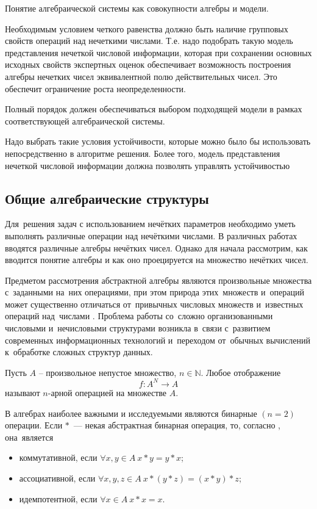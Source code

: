 Понятие алгебраической системы как совокупности алгебры и модели.
 
Необходимым условием четкого равенства должно быть наличие групповых свойств операций над нечеткими числами. Т.е. надо подобрать такую модель представления нечеткой числовой информации, которая при сохранении основных исходных свойств экспертных оценок обеспечивает возможность построения алгебры нечетких чисел эквивалентной  полю действительных чисел. Это обеспечит ограничение роста неопределенности.

Полный порядок должен обеспечиваться выбором подходящей модели в рамках соответствующей алгебраической системы.

Надо выбрать такие условия устойчивости, которые можно было бы использовать непосредственно в алгоритме решения. Более того, модель представления нечеткой числовой информации должна позволять управлять устойчивостью

\subsection{Общие алгебраические структуры}

Для~решения задач с использованием нечётких параметров необходимо уметь выполнять различные операции над нечёткими числами. В различных работах вводятся различные алгебры нечётких чисел. Однако для начала рассмотрим, как вводится понятие алгебры и как оно проецируется на множество нечётких чисел.

Предметом рассмотрения абстрактной алгебры являются произвольные множества с~заданными на~них операциями, при этом природа этих~множеств и~операций может существенно отличаться от~привычных числовых множеств и~известных операций над~числами \cite{Bauman_DM}. Проблема работы со~сложно организованными числовыми и~нечисловыми структурами возникла в~связи с~развитием современных информационных технологий и~переходом от~обычных вычислений к~обработке сложных структур данных.

\begin{mydef}
Пусть $A$ – произвольное непустое множество, $n\in \mathbb{N}$. Любое отображение 
\[
	f:A^N \to A
\] 
называют $n$-арной операцией на множестве $A$.
\end{mydef}

В алгебрах наиболее важными и исследуемыми являются бинарные $\left( n=2 \right)$ операции. Если $*$~--- некая абстрактная бинарная операция, то, согласно \cite{Bauman_DM}, она~является
\begin{itemize}
	\item коммутативной, если $\forall x,y\in A\ x*y=y*x$;
	\item ассоциативной, если $\forall x,y,z\in A\ x*\left( y*z \right)=\left( x*y \right)*z$;
	\item идемпотентной, если $\forall x\in A\ x*x=x$.
\end{itemize}

